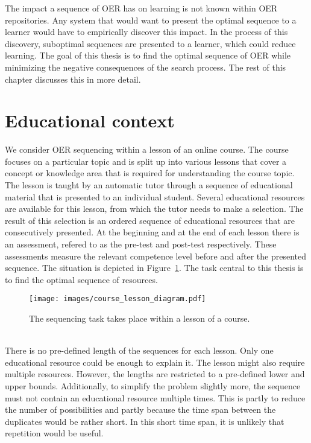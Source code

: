 The impact a sequence of OER has on learning is not known within OER repositories. Any
system that would want to present the optimal sequence to a learner would have
to empirically discover this impact. In the process of this discovery,
suboptimal sequences are presented to a learner, which could reduce learning.
The goal of this thesis is to find the optimal sequence of OER
while minimizing the negative consequences of the search process. The rest of
this chapter discusses this in more detail.
\section{Educational context}
\label{sec:task_context}
	We consider OER sequencing within a lesson of an online course. The course
focuses on a particular topic and is split up into various lessons that cover a
concept or knowledge area that is required for understanding the
course topic. The lesson is taught by an automatic tutor through a sequence of
educational material that is presented to an individual student. Several
educational resources are available for this lesson, from which the tutor needs
to make a selection. The result of this selection is an ordered sequence of
educational resources that are consecutively presented. At the beginning and at
the end of each lesson there is an assessment, refered to as the pre-test and
post-test respectively. These assessments measure the relevant competence level
before and after the presented sequence. The situation is depicted in
Figure~\ref{fig:course_lesson_diagram}. The task central to this thesis is to
find the optimal sequence of resources.\\
\begin{figure}[ht]
	\centering
	\texttt{[image: images/course\_lesson\_diagram.pdf]}
	\caption[Educational context of the task]{The sequencing task takes place
	within a lesson of a course.}
	\label{fig:course_lesson_diagram}
\end{figure}\\
\noindent
There is no pre-defined length of the sequences for each lesson. Only one
educational resource could be enough to explain it. The lesson might also
require multiple resources. However, the lengths are restricted to a
pre-defined lower and upper bounds. Additionally, to simplify the problem
slightly more, the sequence must not contain an educational resource multiple
times. This is partly to reduce the number of possibilities and partly because
the time span between the duplicates would be rather short. In this short time
span, it is unlikely that repetition would be useful.
